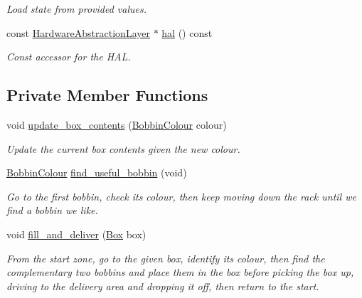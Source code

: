 \begin{DoxyCompactItemize}
\begin{DoxyCompactList}\small\item\em Load state from provided values. \item\end{DoxyCompactList}\item 
const \hyperlink{classIDP_1_1HardwareAbstractionLayer}{HardwareAbstractionLayer} $\ast$ \hyperlink{classIDP_1_1MissionSupervisor_ae19d0c2123fda158cc45e649128fbc09}{hal} () const 
\begin{DoxyCompactList}\small\item\em Const accessor for the HAL. \item\end{DoxyCompactList}\end{DoxyCompactItemize}
\subsection*{Private Member Functions}
\begin{DoxyCompactItemize}
\item 
void \hyperlink{classIDP_1_1MissionSupervisor_a850c2805af7b3de4abdc10a92ce51bcf}{update\_\-box\_\-contents} (\hyperlink{namespaceIDP_a6efd2cca14c0dae1c6458714ce0218df}{BobbinColour} colour)
\begin{DoxyCompactList}\small\item\em Update the current box contents given the new colour. \item\end{DoxyCompactList}\item 
\hyperlink{namespaceIDP_a6efd2cca14c0dae1c6458714ce0218df}{BobbinColour} \hyperlink{classIDP_1_1MissionSupervisor_ae6b46542637f7c9fba8724ca27f225ce}{find\_\-useful\_\-bobbin} (void)
\begin{DoxyCompactList}\small\item\em Go to the first bobbin, check its colour, then keep moving down the rack until we find a bobbin we like. \item\end{DoxyCompactList}\item 
void \hyperlink{classIDP_1_1MissionSupervisor_a23d153155e296b5134a24ef943189acd}{fill\_\-and\_\-deliver} (\hyperlink{namespaceIDP_ad90955841bc9492fb53b1f89cc667e18}{Box} box)
\begin{DoxyCompactList}\small\item\em From the start zone, go to the given box, identify its colour, then find the complementary two bobbins and place them in the box before picking the box up, driving to the delivery area and dropping it off, then return to the start. \item\end{DoxyCompactList}\end{DoxyCompactItemize}
